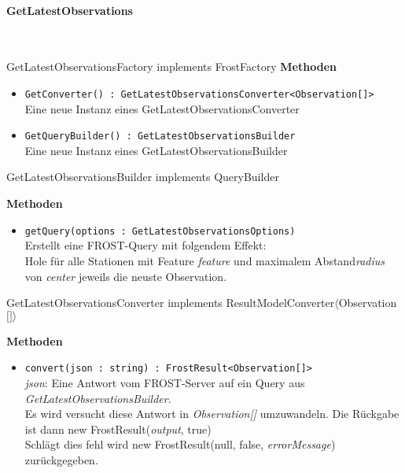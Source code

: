 \paragraph{GetLatestObservations}\mbox{}\\
\begin{Class}{GetLatestObservationsFactory implements FrostFactory}
    \textbf{Methoden}
    \begin{itemize}
        \item \texttt{GetConverter() : GetLatestObservationsConverter<Observation[]>}
        \\ Eine neue Instanz eines GetLatestObservationsConverter
        \item \texttt{GetQueryBuilder() : GetLatestObservationsBuilder}
        \\ Eine neue Instanz eines GetLatestObservationsBuilder
    \end{itemize}
\end{Class}

\begin{Class}{GetLatestObservationsBuilder implements QueryBuilder}

    \textbf{Methoden}
    \begin{itemize}
        \item \texttt{getQuery(options : GetLatestObservationsOptions)}
        \\ Erstellt eine FROST-Query mit folgendem Effekt:
        \\ Hole für alle Stationen mit Feature \emph{feature} und maximalem Abstand\emph{radius} von \emph{center}
        jeweils die neuste Observation. 
    \end{itemize}
\end{Class}

\begin{Class}{GetLatestObservationsConverter implements ResultModelConverter$\langle$Observation$\lbrack\rbrack\rangle$}

    \textbf{Methoden}
    \begin{itemize}
        \item \texttt{convert(json : string) : FrostResult<Observation[]>}
        \\ \emph{json}: Eine Antwort vom FROST-Server auf ein Query aus \emph{GetLatestObservationsBuilder}.
        \\ Es wird versucht diese Antwort in \emph{Observation[]} umzuwandeln.
        Die Rückgabe ist dann new FrostResult(\emph{output}, true)
        \\ Schlägt dies fehl wird new FrostResult(null, false, \emph{errorMessage}) zurückgegeben.
    \end{itemize}
\end{Class}

